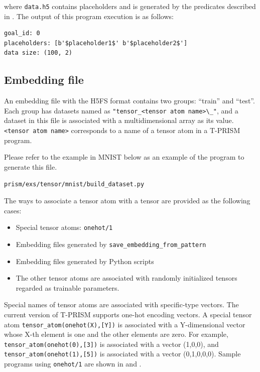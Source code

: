 \documentclass[a4paper]{report}
\begin{document}
where {\tt data.h5} contains placeholders and is generated by the predicates described in .
The output of this program execution is as follows:
\begin{verbatim}
goal_id: 0
placeholders: [b'$placeholder1$' b'$placeholder2$']
data size: (100, 2)
\end{verbatim}


\subsection{Embedding file}

An embedding file with the H5FS format contains two groups: ``train'' and ``test''.
Each group has datasets named as \verb|"tensor_<tensor atom name>\_"|, and a dataset in this file is associated with a multidimensional array as its value.
\verb|<tensor atom name>| corresponds to a name of a tensor atom in a T-PRISM program.


Please refer to the example in MNIST below as an example of the program to generate this file.
\begin{verbatim}
prism/exs/tensor/mnist/build_dataset.py
\end{verbatim}

The ways to associate a tensor atom with a tensor are provided as the following cases:
\begin{itemize}
 \item Special tensor atoms: {\tt onehot/1}
 \item Embedding files generated by {\tt save\_embedding\_from\_pattern}
 \item Embedding files generated by Python scripts 
 \item The other tensor atoms are associated with randomly initialized tensors regarded as trainable parameters.
\end{itemize}

Special names of tensor atoms are associated with specific-type vectors.
The current version of T-PRISM supports one-hot encoding vectors.
A special tensor atom {\tt tensor\_atom(onehot(X),[Y])} is associated with a Y-dimensional vector whose X-th element is one and the other elements are zero.
For example,
{\tt tensor\_atom(onehot(0),[3])} is associated with a vector (1,0,0),
and {\tt tensor\_atom(onehot(1),[5])} is associated with a vector (0,1,0,0,0).
Sample programs using {\tt onehot/1} are shown in  and .
\end{document}
